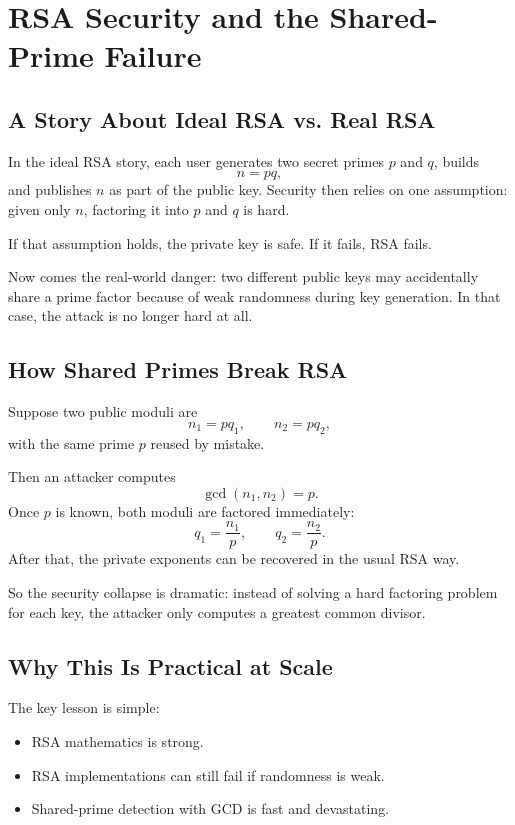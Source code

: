 \chapter{RSA Security and the Shared-Prime Failure}

\section{A Story About Ideal RSA vs. Real RSA}
In the ideal RSA story, each user generates two secret primes \(p\) and \(q\),
builds
\[
n=pq,
\]
and publishes \(n\) as part of the public key. Security then relies on one
assumption: given only \(n\), factoring it into \(p\) and \(q\) is hard.

If that assumption holds, the private key is safe. If it fails, RSA fails.

Now comes the real-world danger: two different public keys may accidentally
share a prime factor because of weak randomness during key generation. In that
case, the attack is no longer hard at all.

\section{How Shared Primes Break RSA}
Suppose two public moduli are
\[
n_1=pq_1,\qquad n_2=pq_2,
\]
with the same prime \(p\) reused by mistake.

Then an attacker computes
\[
\gcd(n_1,n_2)=p.
\]
Once \(p\) is known, both moduli are factored immediately:
\[
q_1=\frac{n_1}{p},\qquad q_2=\frac{n_2}{p}.
\]
After that, the private exponents can be recovered in the usual RSA way.

So the security collapse is dramatic: instead of solving a hard factoring
problem for each key, the attacker only computes a greatest common divisor.

\section{Why This Is Practical at Scale}

The key lesson is simple:
\begin{itemize}
  \item RSA mathematics is strong.
  \item RSA implementations can still fail if randomness is weak.
  \item Shared-prime detection with GCD is fast and devastating.
\end{itemize}

